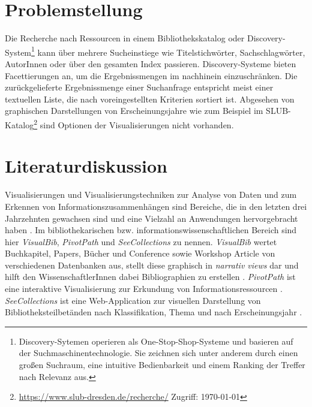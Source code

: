 \documentclass[10pt,a4paper,twocolumn,conference]{IEEEtran}
\begin{document}
\section{Problemstellung}
Die Recherche nach Ressourcen in einem Bibliothekskatalog oder Discovery-System\footnote{Discovery-Sytemen operieren als 
One-Stop-Shop-Systeme und basieren auf der Suchmaschinentechnologie. Sie zeichnen sich unter anderem durch einen großen 
Suchraum, eine intuitive Bedienbarkeit und einem Ranking der Treffer nach
Relevanz aus.} kann über mehrere Sucheinstiege wie Titelstichwörter, 
Sachschlagwörter, AutorInnen oder über den gesamten Index passieren. 
Discovery-Systeme bieten Facettierungen an, um die Ergebnissmengen im nachhinein
einzuschränken. Die zurückgelieferte Ergebnissmenge einer
Suchanfrage entspricht meist einer textuellen Liste, die nach voreingestellten Kriterien
sortiert ist. Abgesehen von graphischen Darstellungen von Erscheinungsjahre wie
zum Beispiel im SLUB-Katalog\footnote{\url{https://www.slub-dresden.de/recherche/} Zugriff:
\today} sind Optionen der Visualisierungen nicht vorhanden.
\section{Literaturdiskussion}
Visualisierungen und Visualisierungstechniken zur Analyse von Daten und zum Erkennen von
Informationszusammenhängen sind Bereiche, die in den letzten drei Jahrzehnten
gewachsen sind und eine Vielzahl an Anwendungen hervorgebracht haben \cite{RN14}. Im
bibliothekarischen bzw. informationswissenschaftlichen Bereich sind hier
\textit{VisualBib}, \textit{PivotPath} und \textit{SeeCollections} zu nennen.
\textit{VisualBib} wertet Buchkapitel, Papers, Bücher und Conference sowie Workshop Article 
von verschiedenen Datenbanken aus, stellt diese graphisch in
\textit{narrativ views} dar und hilft den WissenschaftlerInnen dabei Bibliographien zu erstellen \cite{RN17}. \textit{PivotPath} ist eine interaktive
Visualisierung zur Erkundung von Informationsressourcen \cite{RN12}. 
\textit{SeeCollections} ist eine Web-Application zur visuellen
Darstellung von Bibliotheksteilbetänden nach Klassifikation, Thema und nach
Erscheinungsjahr \cite{RN9}.
\end{document}
